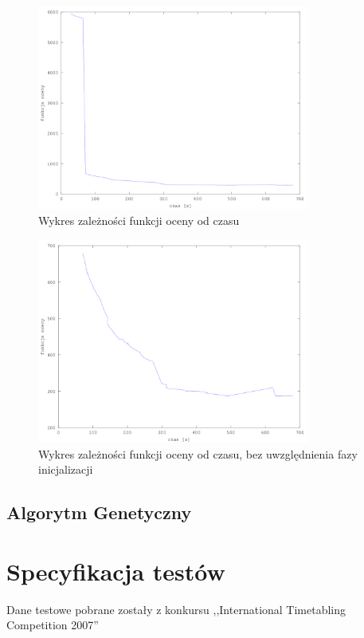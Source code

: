 \begin{figure}[H]
  \caption{Wykres zależności funkcji oceny od czasu}
  \centering
    \includegraphics[width=0.8\textwidth]{ogolny2_instancja.png}
\end{figure}
\begin{figure}[H]
  \caption{Wykres zależności funkcji oceny od czasu, bez uwzględnienia fazy inicjalizacji}
  \centering
    \includegraphics[width=0.8\textwidth]{szczegolowy2_instancja.png}
\end{figure}
\subsection{Algorytm Genetyczny}
\section{Specyfikacja testów}
Dane testowe pobrane zostały z konkursu ,,International Timetabling Competition 2007''
